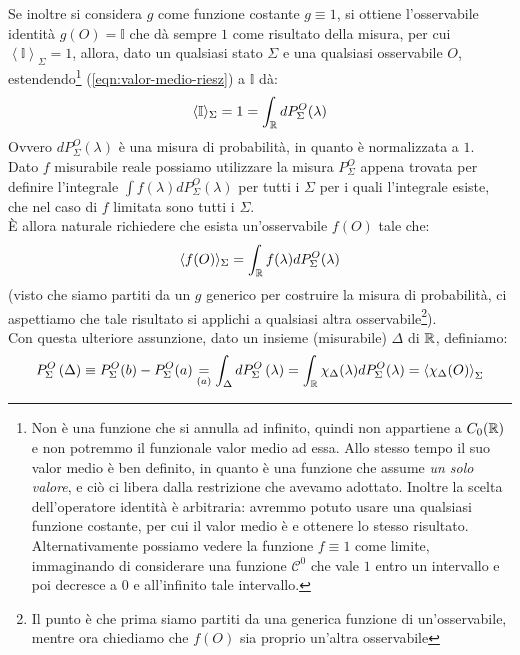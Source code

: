 \documentclass[FisicaTeorica.tex]{subfiles}
\begin{document}
Se inoltre si considera $g$ come funzione costante $g \equiv 1$, si  ottiene l'osservabile identità $g(O) = \mathbb{I}$ che dà sempre $1$ come risultato della misura, per cui $\left\langle\mathbb{I}\right\rangle_\Sigma=1$, allora, dato un qualsiasi stato $\Sigma$ e una qualsiasi osservabile $O$,  estendendo\footnote{Non è una funzione che si annulla ad infinito, quindi non appartiene a $C_0(\mathbb{R})$ e non potremmo  il funzionale valor medio ad essa. Allo stesso tempo il suo valor medio è ben definito, in quanto è una funzione che assume \textit{un solo valore}, e ciò ci libera dalla restrizione che avevamo adottato. Inoltre la scelta dell'operatore identità è arbitraria: avremmo potuto usare una qualsiasi funzione costante, per cui il valor medio è  e ottenere lo stesso risultato. Alternativamente possiamo vedere la funzione $f\equiv 1$ come limite, immaginando di considerare una funzione $\mathcal{C}^0$ che vale $1$ entro un intervallo e poi decresce a $0$ e  all'infinito tale intervallo.} (\ref{eqn:valor-medio-riesz}) a $\mathbb{I}$ dà:
\[
\langle \mathbb{I}\rangle_\Sigma = 1 = \int_{\mathbb{R}} dP_\Sigma^O (\lambda)
\]
Ovvero $dP_\Sigma^O\left(\lambda\right)$ è una misura di probabilità, in quanto è normalizzata a $1$.\\%
Dato $f$ misurabile reale possiamo utilizzare la misura $P_\Sigma^O$ appena trovata per definire l'integrale
$\int f\left(\lambda\right) dP_\Sigma^O(\lambda)$ per tutti i $\Sigma$ per i quali l'integrale esiste, che nel caso di $f$ limitata sono tutti i $\Sigma$.\\
È allora naturale richiedere che esista un'osservabile $f(O)$ tale che: %
\[
\langle f(O)\rangle_\Sigma = \int_{\mathbb{R}} f(\lambda) dP_\Sigma^O(\lambda)
\]
(visto che siamo partiti da un $g$ generico per costruire la misura di probabilità, ci aspettiamo che tale risultato si applichi a qualsiasi altra osservabile\footnote{Il punto è che prima siamo partiti da una generica funzione di un'osservabile, mentre ora chiediamo che $f(O)$ sia proprio un'altra osservabile}).\\
Con questa ulteriore assunzione, dato un insieme (misurabile) $\Delta$ di $\mathbb{R}$, definiamo:
\begin{align}
P_\Sigma^O\left(\Delta\right) \equiv P_\Sigma^O(b) - P_\Sigma^O(a) \underset{(a)}{=} \int_{\Delta}{dP_\Sigma^O\left(\lambda\right)=
\int_{\mathbb{R}} \chi_\Delta(\lambda) dP_\Sigma^O(\lambda) = 
\left\langle\chi_\Delta(O)\right\rangle_\Sigma}
\label{eqn:Psigmadelta}
\end{align} 
\end{document}
